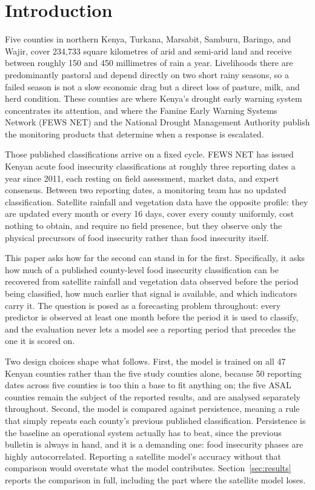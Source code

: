 \documentclass[11pt]{article}
\begin{document}
\section{Introduction}
\label{sec:intro}

Five counties in northern Kenya, Turkana, Marsabit, Samburu, Baringo, and
Wajir, cover 234,733 square kilometres of arid and semi-arid land and receive
between roughly 150 and 450 millimetres of rain a year. Livelihoods there are
predominantly pastoral and depend directly on two short rainy seasons, so a
failed season is not a slow economic drag but a direct loss of pasture, milk,
and herd condition. These counties are where Kenya's drought early warning
system concentrates its attention, and where the Famine Early Warning Systems
Network (FEWS NET) and the National Drought Management Authority publish the
monitoring products that determine when a response is escalated.

Those published classifications arrive on a fixed cycle. FEWS NET has issued
Kenyan acute food insecurity classifications at roughly three reporting dates a
year since 2011, each resting on field assessment, market data, and expert
consensus. Between two reporting dates, a monitoring team has no updated
classification. Satellite rainfall and vegetation data have the opposite
profile: they are updated every month or every 16 days, cover every county
uniformly, cost nothing to obtain, and require no field presence, but they
observe only the physical precursors of food insecurity rather than food
insecurity itself.

This paper asks how far the second can stand in for the first. Specifically, it
asks how much of a published county-level food insecurity classification can be
recovered from satellite rainfall and vegetation data observed before the period
being classified, how much earlier that signal is available, and which
indicators carry it. The question is posed as a forecasting problem throughout:
every predictor is observed at least one month before the period it is used to
classify, and the evaluation never lets a model see a reporting period that
precedes the one it is scored on.

Two design choices shape what follows. First, the model is trained on all 47
Kenyan counties rather than the five study counties alone, because 50 reporting
dates across five counties is too thin a base to fit anything on; the five ASAL
counties remain the subject of the reported results, and are analysed separately
throughout. Second, the model is compared against persistence, meaning a rule
that simply repeats each county's previous published classification. Persistence
is the baseline an operational system actually has to beat, since the previous
bulletin is always in hand, and it is a demanding one: food insecurity phases
are highly autocorrelated. Reporting a satellite model's accuracy without that
comparison would overstate what the model contributes. Section~\ref{sec:results}
reports the comparison in full, including the part where the satellite model
loses.
\end{document}
